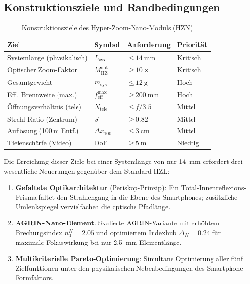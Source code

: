 ﻿\documentclass[12pt,a4paper]{article}
\theoremstyle{definition}
\newcommand{\HZ}{\mathrm{HZ}}
\newcommand{\eff}{\mathrm{eff}}
\begin{document}
	\subsection{Konstruktionsziele und Randbedingungen}

	\begin{table}[H]
		\centering
		\caption{Konstruktionsziele des Hyper-Zoom-Nano-Moduls (HZN)}
		\label{tab:hzn_goals}
		\begin{tabular}{llll}
			\toprule
			\textbf{Ziel} & \textbf{Symbol} & \textbf{Anforderung} & \textbf{Priorit\"at}\\
			\midrule
			\rowcolor{blue!8}
			Systeml\"ange (physikalisch) & $L_\mathrm{sys}$ & $\leq \SI{14}{\milli\metre}$ & Kritisch \\
			Optischer Zoom-Faktor       & $M_\HZ^\mathrm{opt}$ & $\geq 10\times$           & Kritisch \\
			\rowcolor{blue!8}
			Gesamtgewicht               & $m_\mathrm{sys}$     & $\leq \SI{12}{\gram}$     & Hoch \\
			Eff.\ Brennweite (max.)     & $f_\eff^\mathrm{max}$& $\geq \SI{200}{\milli\metre}$ & Hoch \\
			\rowcolor{blue!8}
			\"Offnungsverh\"altnis (tele) & $N_\mathrm{tele}$  & $\leq f/3.5$              & Mittel \\
			Strehl-Ratio (Zentrum)      & $S$                  & $\geq 0.82$               & Mittel \\
			\rowcolor{blue!8}
			Aufl\"osung (100\,m Entf.)  & $\Delta x_{100}$     & $\leq \SI{3}{\centi\metre}$ & Mittel \\
			Tiefensch\"arfe (Video)     & DoF                  & $\geq \SI{5}{\metre}$     & Niedrig \\
			\bottomrule
		\end{tabular}
	\end{table}

	Die Erreichung dieser Ziele bei einer Systeml\"ange von nur
	\SI{14}{\milli\metre} erfordert drei wesentliche Neuerungen gegen\"uber dem
	Standard-HZL:
	\begin{enumerate}[label=(\roman*)]
		\item \textbf{Gefaltete Optikarchitektur} (Periskop-Prinzip): Ein
		Total-Innenreflexions-Prisma faltet den Strahlengang in die Ebene des
		Smartphones; zus\"atzliche Umlenkspiegel vervielfachen die optische
		Pfadl\"ange.
		\item \textbf{AGRIN-Nano-Element}: Skalierte AGRIN-Variante mit erh\"ohtem
		Brechungsindex $n_0^N = 2.05$ und optimiertem Indexhub $\Delta_N = 0.24$
		f\"ur maximale Fokuswirkung bei nur \SI{2.5}{\milli\metre} Elementl\"ange.
		\item \textbf{Multikriterielle Pareto-Optimierung}: Simultane Optimierung
		aller f\"unf Zielfunktionen unter den physikalischen Nebenbedingungen des
		Smartphone-Form\-faktors.
	\end{enumerate}
\end{document}
